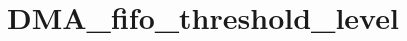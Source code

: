 \hypertarget{group___d_m_a__fifo__threshold__level}{\section{D\-M\-A\-\_\-fifo\-\_\-threshold\-\_\-level}
\label{group___d_m_a__fifo__threshold__level}
}

